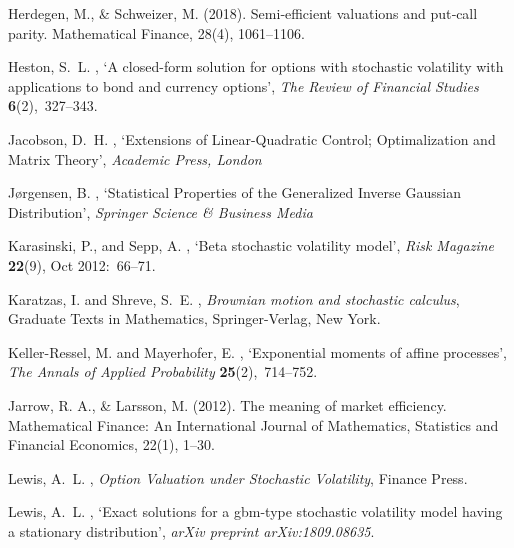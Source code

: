 \documentclass[pdftex,11pt,a4paper] {article}
\begin{document}
\begin{thebibliography}{}
Herdegen, M., \& Schweizer, M. (2018). Semi‐efficient valuations and put‐call parity. Mathematical Finance, 28(4), 1061--1106.

Heston, S.~L.  \harvardyearright , `A closed-form solution
  for options with stochastic volatility with applications to bond and currency
  options', {\em The Review of Financial Studies} {\bf 6}(2),~327--343.


Jacobson, D.~H.  \harvardyearright , `Extensions of Linear-Quadratic Control; Optimalization and Matrix Theory', {\em Academic Press, London}


J{\o}rgensen, B.  \harvardyearright , `Statistical Properties of the Generalized Inverse Gaussian Distribution', {\em Springer Science \& Business Media}
	
Karasinski, P., and Sepp, A.  \harvardyearright, `Beta stochastic volatility model', {\em Risk Magazine} {\bf 22}(9), Oct 2012:~66--71.
	
Karatzas, I. and Shreve, S.~E.  \harvardyearright
  , {\em Brownian motion and stochastic calculus}, Graduate Texts in
  Mathematics, Springer-Verlag, New York.

Keller-Ressel, M. and Mayerhofer, E.  \harvardyearright , `Exponential moments of affine processes', {\em The
  Annals of Applied Probability} {\bf 25}(2),~714--752.

Jarrow, R. A., \& Larsson, M. (2012). The meaning of market efficiency. Mathematical Finance: An International Journal of Mathematics, Statistics and Financial Economics, 22(1), 1--30.

Lewis, A.~L.  \harvardyearright , {\em Option Valuation
  under Stochastic Volatility}, Finance Press.


Lewis, A.~L.  \harvardyearright , `Exact solutions for a
  gbm-type stochastic volatility model having a stationary distribution', {\em
  arXiv preprint arXiv:1809.08635}.


\end{thebibliography}
\end{document}
